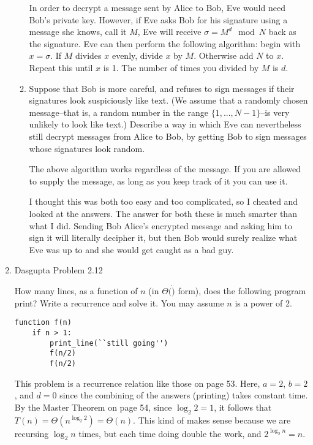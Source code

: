 \documentclass[a4paper,12pt]{article}
\begin{document}
\begin{enumerate}
\begin{enumerate}
    \vspace{5mm}

    In order to decrypt a message sent by Alice to Bob, Eve would need Bob's private key. However, if Eve asks Bob for his signature using a message she knows, call it $M$, Eve will receive $\sigma = M^d \mod N$ back as the signature. Eve can then perform the following algorithm: begin with $x = \sigma$. If $M$ divides $x$ evenly, divide $x$ by $M$. Otherwise add $N$ to $x$. Repeat this until $x$ is 1. The number of times you divided by $M$ is $d$.

    \item Suppose that Bob is more careful, and refuses to sign messages if their signatures look suspiciously like text. (We assume that a randomly chosen message--that is, a random number in the range $\{1, ..., N - 1\}$--is very unlikely to look like text.) Describe a way in which Eve can nevertheless still decrypt messages from Alice to Bob, by getting Bob to sign messages whose signatures look random.

    \vspace{5mm}

    The above algorithm works regardless of the message. If you are allowed to supply the message, as long as you keep track of it you can use it.

    I thought this was both too easy and too complicated, so I cheated and looked at the answers. The answer for both these is much smarter than what I did. Sending Bob Alice's encrypted message and asking him to sign it will literally decipher it, but then Bob would surely realize what Eve was up to and she would get caught as a bad guy. 
\end{enumerate}

\item Dasgupta Problem 2.12

How many lines, as a function of $n$ (in $\Theta(\dot)$ form), does the following program print? Write a recurrence and solve it. You may assume $n$ is a power of 2.

\begin{verbatim}
function f(n)
    if n > 1:
        print_line(``still going'')
        f(n/2)
        f(n/2)
\end{verbatim}

\vspace{5mm}

This problem is a recurrence relation like those on page 53. Here, $a = 2$, $b = 2$, and $d = 0$ since the combining of the answers (printing) takes constant time. By the Master Theorem on page 54, since $\log_2 2 = 1$, it follows that $T(n) = \Theta(n^{\log_2 2}) = \Theta(n)$. This kind of makes sense because we are recursing $\log_2 n$ times, but each time doing double the work, and $2^{\log_2 n} = n$.


\end{enumerate}
\end{document}
